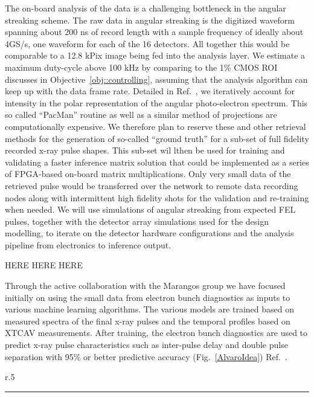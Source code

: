 The on-board analysis of the data is a challenging bottleneck in the angular streaking scheme.
The raw data in angular streaking is the digitized waveform spanning about 200 ns of record length with a sample frequency of ideally about 4GS/s, one waveform for each of the 16 detectors.
All together this would be comparable to a 12.8 kPix image being fed into the analysis layer.
We estimate a maximum duty-cycle above 100 kHz by comparing to the 1\% CMOS ROI discusses in Objective~\ref{obj::controlling}, assuming that the analysis algorithm can keep up with the data frame rate.
Detailed in Ref.~\cite{Nick2018}, we iteratively account for intensity in the polar representation of the angular photo-electron spectrum.
This so called ``PacMan'' routine as well as a similar method of projections \cite{Siqi2018} are computationally expensive.
We therefore plan to reserve these and other retrieval methods \cite{Thomas2015,HJWorner2018} for the generation of so-called ``ground truth'' for a sub-set of full fidelity recorded x-ray pulse shapes.
This sub-set wil lthen be used for training and validating a faster inference matrix solution that could be implemented as a series of FPGA-based on-board matrix multiplications.
Only very small data of the retrieved pulse would be transferred over the network to remote data recording nodes along with intermittent high fidelity shots for the validation and re-training when needed.
We will use simulations of angular streaking from expected FEL pulses, together with the detector array simulations used for the design modelling, to iterate on the detector hardware configurations and the analysis pipeline from electronics to inference output.

HERE HERE HERE 




Through the active collaboration with the Marangos group we have focused initially on using the small data from electron bunch diagnostics as inputs to various machine learning algorithms. \cite{AlvaroML2016}
The various models are trained based on measured spectra of the final x-ray pulses and the temporal profiles based on XTCAV measurements.
After training, the electron bunch diagnostics are used to predict x-ray pulse characteristics such as inter-pulse delay and double pulse separation with 95\% or better predictive accuracy (Fig.~\ref{AlvaroIdea}) Ref.~\cite{AlvaroML2016}. 

\begin{wrapfigure}[27]{r}{.5\linewidth}
\vspace{-1\baselineskip}
\centerline{
}
\hrule
\centerline{
}
\vspace{-2\baselineskip}
\caption{\label{AlvaroIdea} The efficacy of machine learning for predicting temporal delay (top) and color separation (bottom) for shaped FEL pulses. \cite{AlvaroML2016}}
\end{wrapfigure}

